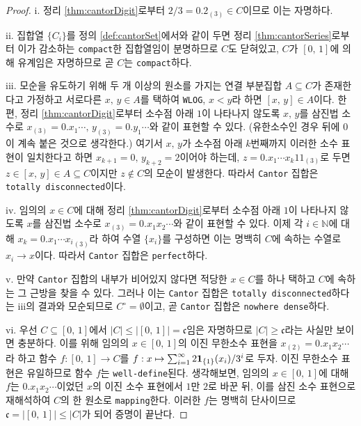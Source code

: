 \begin{proof}
    i. 정리 \ref{thm:cantorDigit}로부터 $2/3=0.2_{(3)}\in C$이므로 이는 자명하다.

    ii. 집합열 $\{C_i\}$를 정의 \ref{def:cantorSet}에서와 같이 두면 정리 \ref{thm:cantorSeries}로부터 이가 감소하는 \texttt{compact}한 집합열임이 분명하므로 $C$도 닫혀있고, $C$가 $[0,\,1]$에 의해 유계임은 자명하므로 곧 $C$는 \texttt{compact}하다.

    iii. 모순을 유도하기 위해 두 개 이상의 원소를 가지는 연결 부분집합 $A\subseteq C$가 존재한다고 가정하고 서로다른 $x,\,y\in A$를 택하여 \texttt{WLOG}, $x<y$라 하면 $[x,\,y]\in A$이다. 한편, 정리 \ref{thm:cantorDigit}로부터 소수점 아래 $1$이 나타나지 않도록 $x,\,y$를 삼진법 소수로 $x_{(3)}=0.x_1\cdots,\,y_{(3)}=0.y_1\cdots$와 같이 표현할 수 있다. (유한소수인 경우 뒤에 $0$이 계속 붙은 것으로 생각한다.) 여기서 $x,\,y$가 소수점 아래 $k$번째까지 이러한 소수 표현이 일치한다고 하면 $x_{k+1}=0,\,y_{k+2}=2$이어야 하는데, $z=0.x_1\cdots x_k11_{(3)}$로 두면 $z\in[x,\,y]\in A\subseteq C$이지만 $z\notin C$의 모순이 발생한다. 따라서 \texttt{Cantor} 집합은 \texttt{totally disconnected}이다.

    iv. 임의의 $x\in C$에 대해 정리 \ref{thm:cantorDigit}로부터 소수점 아래 $1$이 나타나지 않도록 $x$를 삼진법 소수로 $x_{(3)}=0.x_1x_2\cdots$와 같이 표현할 수 있다. 이제 각 $i\in\mathbb{N}$에 대해 $x_k=0.x_1\cdots {x_i}_{(3)}$라 하여 수열 $\{x_i\}$를 구성하면 이는 명백히 $C$에 속하는 수열로 $x_i\to x$이다. 따라서 \texttt{Cantor} 집합은 \texttt{perfect}하다.

    v. 만약 \texttt{Cantor} 집합의 내부가 비어있지 않다면 적당한 $x\in C$를 하나 택하고 $C$에 속하는 그 근방을 찾을 수 있다. 그러나 이는 \texttt{Cantor} 집합은 \texttt{totally disconnected}하다는 iii의 결과와 모순되므로 $C^\circ=\emptyset$이고, 곧 \texttt{Cantor} 집합은 \texttt{nowhere dense}하다.

    vi. 우선 $C\subseteq[0,\,1]$에서 $|C|\leq|[0,\,1]|=\mathfrak{c}$임은 자명하므로 $|C|\geq\mathfrak{c}$라는 사실만 보이면 충분하다. 이를 위해 임의의 $x\in[0,\,1]$의 이진 무한소수 표현을 $x_{(2)}=0.x_1x_2\cdots$라 하고 함수 $f:[0,\,1]\to C$를 $f:x\mapsto\sum_{i=1}^\infty2\mathbf{1}_{\{1\}}(x_i)/3^i$로 두자. 이진 무한소수 표현은 유일하므로 함수 $f$는 \texttt{well-define}된다. 생각해보면, 임의의 $x\in[0,\,1]$에 대해 $f$는 $0.x_1x_2\cdots$이었던 $x$의 이진 소수 표현에서 $1$만 $2$로 바꾼 뒤, 이를 삼진 소수 표현으로 재해석하여 $C$의 한 원소로 \texttt{mapping}한다. 이러한 $f$는 명백히 단사이므로 $\mathfrak{c}=|[0,\,1]|\leq|C|$가 되어 증명이 끝난다.


\end{proof}
